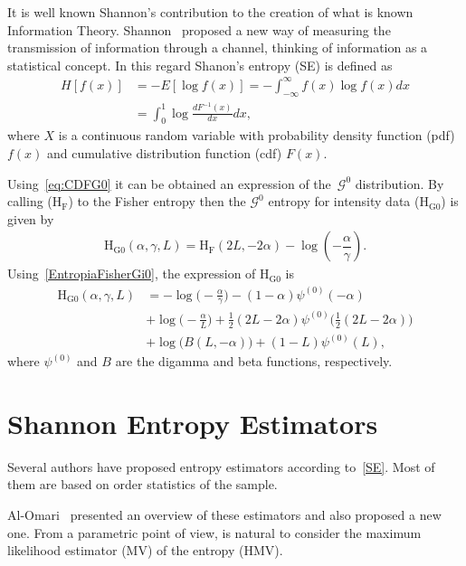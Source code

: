 \documentclass[journal]{IEEEtran}
\begin{document}
It is well known Shannon's contribution to the creation of what is known Information Theory. 
Shannon~\cite{Shannon1948} proposed a new way of
measuring the transmission of information through a channel, thinking of information as a statistical concept. 
In this regard Shanon's entropy (SE) is defined as
\begin{align}
	\label{SE}
	H[f(x)]&=-E[\log f(x)]=-\int_{-\infty}^{\infty} f(x) \log f(x) d x\\
	       &= \int_{0}^{1} \log \frac{d F^{-1}(x)}{d x} d x,
\end{align}
where $X$ is a continuous random variable with probability density function (pdf) $f(x)$ and
cumulative distribution function (cdf) $F(x)$. 

Using~\eqref{eq:CDFG0} it can be obtained an expression of the~$\mathcal{G}^0$ distribution. By calling ($\text{H}_{\text{F}}$) to the Fisher entropy then the $\mathcal{G}^0$ entropy for intensity data ($\text{H}_{\text{G0}}$) is given by
\begin{align}
	\label{EntropiaFisherGi0}
	\text{H}_{\text{G0}}(\alpha,\gamma,L)=\text{H}_{\text{F}}(2 L, - 2 \alpha) -\log(-\dfrac{\alpha}{\gamma}).
\end{align}
Using~\eqref{EntropiaFisherGi0}, the
expression of $\text{H}_{\text{G0}}$ is
\begin{align}
	\label{EG0}
	\text{H}_{\text{G0}}(\alpha,\gamma,L)&=-\log \Big(-\frac{\alpha }{\gamma }\Big)-(1-\alpha ) \psi^{(0)}(-\alpha )\\ \nonumber
	&+\log \Big(-\frac{\alpha }{L}\Big)+\frac{1}{2} (2 L-2 \alpha ) \psi ^{(0)}\Big(\frac{1}{2} (2 L-2 \alpha )\Big)\\ \nonumber
	&+\log \big(B(L,-\alpha )\big)+(1-L) \psi^{(0)}(L),
\end{align}
where $\psi^{(0)}$ and $B$ are the digamma and beta functions, respectively.

\section{Shannon Entropy Estimators}

Several authors have proposed entropy estimators according to~\eqref{SE}.
Most of them are based on order statistics of the sample. 

Al-Omari~\cite{AlOmari2016} presented an overview of these estimators and also proposed a new one. 
From a parametric point of view, is natural to consider the maximum likelihood estimator (MV) of the entropy (HMV).
\end{document}
